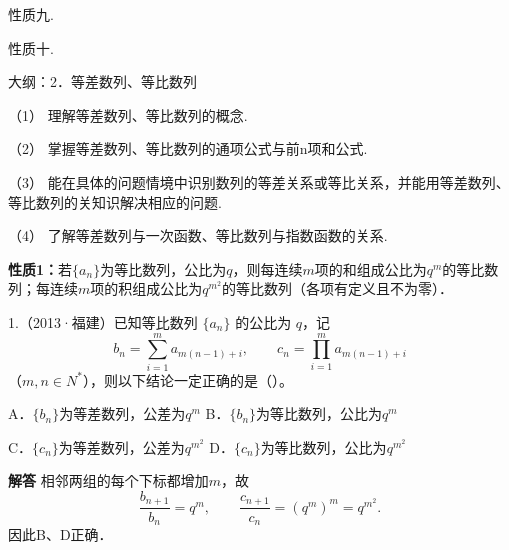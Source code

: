\qquad{}性质九.\par
\qquad{}性质十.\par
\par\bigskip{}\par
大纲：2．等差数列、等比数列\par
（1） 理解等差数列、等比数列的概念.\par
（2） 掌握等差数列、等比数列的通项公式与前n项和公式.\par
（3） 能在具体的问题情境中识别数列的等差关系或等比关系，并能用等差数列、等比数列的关知识解决相应的问题.\par
（4） 了解等差数列与一次函数、等比数列与指数函数的关系.\par
\par\medskip\noindent\textbf{性质1：}若$\{a_n\}$为等比数列，公比为$q$，则每连续$m$项的和组成公比为$q^m$的等比数列；每连续$m$项的积组成公比为$q^{m^2}$的等比数列（各项有定义且不为零）．\par
{}
1.（2013·福建）已知等比数列 $\{a_n\}$ 的公比为 $q$，记\[b_n=\sum_{i=1}^{m}a_{m(n-1)+i},\qquad{}c_n=\prod_{i=1}^{m}a_{m(n-1)+i}\]（$m,n\in N^*$），则以下结论一定正确的是（\quad）。\par
A．$\{b_n\}$为等差数列，公差为$q^m$\qquad{}
B．$\{b_n\}$为等比数列，公比为$q^m$\par
C．$\{c_n\}$为等差数列，公差为$q^{m^2}$\qquad{}
D．$\{c_n\}$为等比数列，公比为$q^{m^2}$\par
\QuestionSpace{1.2cm}
\ifshowanswers
\par\begingroup\color{solutioncolor}\noindent\textbf{解答}\quad
相邻两组的每个下标都增加$m$，故
\[
\frac{b_{n+1}}{b_n}=q^m,\qquad
\frac{c_{n+1}}{c_n}=(q^m)^m=q^{m^2}.
\]
因此B、D正确．\par
\par\endgroup\fi

